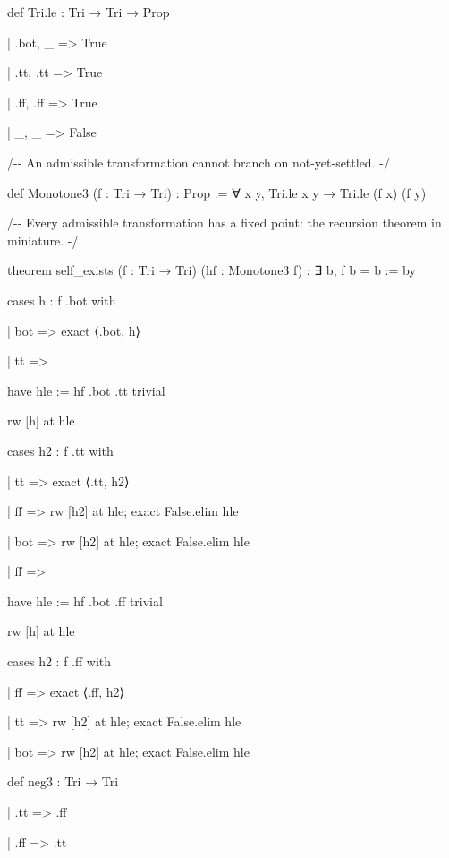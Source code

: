 \documentclass[10pt,twocolumn]{article}
\newenvironment{Shaded}{}{}
\newcommand{\NormalTok}[1]{#1}
\providecommand{\NormalTok}[1]{#1}
\providecommand{\NormalTok}[1]{#1}
\begin{document}
\begin{strip}
\begin{Shaded}
\begin{Highlighting}[]
\NormalTok{def Tri.le : Tri → Tri → Prop}

\NormalTok{  | .bot, \_ =\textgreater{} True}

\NormalTok{  | .tt, .tt =\textgreater{} True}

\NormalTok{  | .ff, .ff =\textgreater{} True}

\NormalTok{  | \_, \_ =\textgreater{} False}

\NormalTok{/{-}{-} An admissible transformation cannot branch on not{-}yet{-}settled. {-}/}

\NormalTok{def Monotone3 (f : Tri → Tri) : Prop := ∀ x y, Tri.le x y → Tri.le (f x) (f y)}

\NormalTok{/{-}{-} Every admissible transformation has a fixed point: the recursion theorem in miniature. {-}/}

\NormalTok{theorem self\_exists (f : Tri → Tri) (hf : Monotone3 f) : ∃ b, f b = b := by}

\NormalTok{  cases h : f .bot with}

\NormalTok{  | bot =\textgreater{} exact ⟨.bot, h⟩}

\NormalTok{  | tt =\textgreater{}}

\NormalTok{    have hle := hf .bot .tt trivial}

\NormalTok{    rw [h] at hle}

\NormalTok{    cases h2 : f .tt with}

\NormalTok{    | tt =\textgreater{} exact ⟨.tt, h2⟩}

\NormalTok{    | ff =\textgreater{} rw [h2] at hle; exact False.elim hle}

\NormalTok{    | bot =\textgreater{} rw [h2] at hle; exact False.elim hle}

\NormalTok{  | ff =\textgreater{}}

\NormalTok{    have hle := hf .bot .ff trivial}

\NormalTok{    rw [h] at hle}

\NormalTok{    cases h2 : f .ff with}

\NormalTok{    | ff =\textgreater{} exact ⟨.ff, h2⟩}

\NormalTok{    | tt =\textgreater{} rw [h2] at hle; exact False.elim hle}

\NormalTok{    | bot =\textgreater{} rw [h2] at hle; exact False.elim hle}

\NormalTok{def neg3 : Tri → Tri}

\NormalTok{  | .tt =\textgreater{} .ff}

\NormalTok{  | .ff =\textgreater{} .tt}


\end{Highlighting}
\end{Shaded}
\end{strip}
\end{document}
